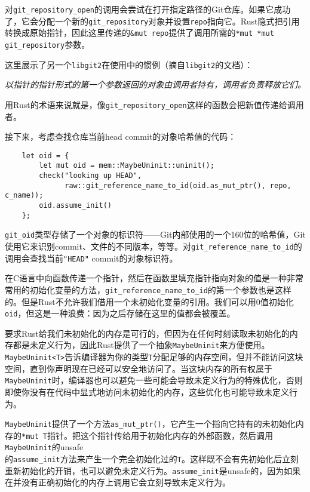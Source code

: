 对\texttt{git\_repository\_open}的调用会尝试在打开指定路径的Git仓库。如果它成功了，它会分配一个新的\texttt{git\_repository}对象并设置\texttt{repo}指向它。Rust隐式把引用转换成原始指针，因此这里传递的\texttt{\&mut repo}提供了调用所需的\texttt{*mut *mut git\_repository}参数。

这里展示了另一个\texttt{libgit2}在使用中的惯例（摘自\texttt{libgit2}的文档）：

\emph{以指针的指针形式的第一个参数返回的对象由调用者持有，调用者负责释放它们。}

用Rust的术语来说就是，像\texttt{git\_repository\_open}这样的函数会把新值传递给调用者。

接下来，考虑查找仓库当前head commit的对象哈希值的代码：
\begin{verbatim}
    let oid = {
        let mut oid = mem::MaybeUninit::uninit();
        check("looking up HEAD",
              raw::git_reference_name_to_id(oid.as_mut_ptr(), repo, c_name));
        oid.assume_init()
    };
\end{verbatim}

\texttt{git\_oid}类型存储了一个对象的标识符——Git内部使用的一个160位的哈希值，Git使用它来识别commit、文件的不同版本，等等。对\texttt{git\_reference\_name\_to\_id}的调用会查找当前\texttt{"HEAD"} commit的对象标识符。

在C语言中向函数传递一个指针，然后在函数里填充指针指向对象的值是一种非常常用的初始化变量的方法，\texttt{git\_reference\_name\_to\_id}的第一个参数也是这样的。但是Rust不允许我们借用一个未初始化变量的引用。我们可以用0值初始化\texttt{oid}，但这是一种浪费：因为之后存储在这里的值都会被覆盖。

要求Rust给我们未初始化的内存是可行的，但因为在任何时刻读取未初始化的内存都是未定义行为，因此Rust提供了一个抽象\texttt{MaybeUninit}来方便使用。\texttt{MaybeUninit<T>}告诉编译器为你的类型\texttt{T}分配足够的内存空间，但并不能访问这块空间，直到你声明现在已经可以安全地访问了。当这块内存的所有权属于\texttt{MaybeUninit}时，编译器也可以避免一些可能会导致未定义行为的特殊优化，否则即使你没有在代码中显式地访问未初始化的内存，这些优化也可能导致未定义行为。

\texttt{MaybeUninit}提供了一个方法\texttt{as\_mut\_ptr()}，它产生一个指向它持有的未初始化内存的\texttt{*mut T}指针。把这个指针传给用于初始化内存的外部函数，然后调用\texttt{MaybeUninit}的unsafe\\
的\texttt{assume\_init}方法来产生一个完全初始化过的\texttt{T}。这样既不会有先初始化后立刻重新初始化的开销，也可以避免未定义行为。\texttt{assume\_init}是unsafe的，因为如果在并没有正确初始化的内存上调用它会立刻导致未定义行为。

